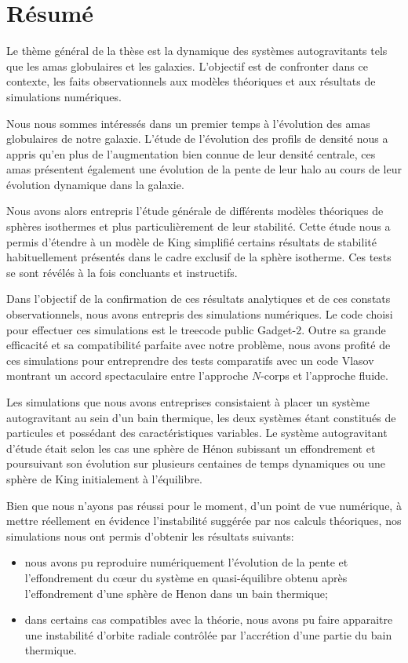 \documentclass[a4paper,11pt,twoside,openright]{report}
\renewcommand{\(}{\ensuremath{\left(}}
\renewcommand{\)}{\ensuremath{\right)}}
\begin{document}
	\chapter*{Résumé}
		Le thème général de la thèse est la dynamique des
		systèmes autogravitants tels que les amas globulaires et les galaxies.
		L'objectif est de confronter dans ce contexte, les faits observationnels aux
		modèles théoriques et aux résultats de simulations numériques.
		
		Nous nous sommes intéressés dans un premier temps à l'évolution des
		amas globulaires de notre galaxie. L'étude de l'évolution des profils de
		densité nous a appris
		qu'en plus de l'augmentation bien connue de leur densité centrale, ces
		amas présentent également une évolution de la pente de leur halo au
		cours de leur évolution dynamique dans la galaxie.

		Nous avons alors entrepris l'étude générale de différents modèles
		théoriques de sphères isothermes et plus particulièrement de leur
		stabilité. Cette étude nous a permis d'étendre à un modèle de King
		simplifié certains résultats de stabilité habituellement présentés dans
		le cadre exclusif de la sphère isotherme. Ces tests se sont révélés à
		la fois concluants et instructifs.

		Dans l'objectif de la confirmation de ces résultats analytiques et de ces
		constats observationnels, nous avons entrepris des simulations numériques. Le
		code choisi pour effectuer ces simulations est le treecode public Gadget-2.
		Outre sa grande efficacité et sa compatibilité parfaite avec notre problème,
		nous avons profité de ces simulations pour entreprendre des tests comparatifs
		avec un code Vlasov montrant un accord spectaculaire entre l'approche $N$-corps et l'approche fluide.

		Les simulations que nous avons entreprises consistaient à placer un système
		autogravitant au sein d'un bain thermique, les deux systèmes étant constitués
		de particules et possédant des caractéristiques variables. Le système
		autogravitant d'étude était selon les cas une sphère de Hénon subissant un
		effondrement et poursuivant son évolution sur plusieurs centaines de temps
		dynamiques ou une sphère de King initialement à l'équilibre.

		Bien que nous n'ayons pas réussi pour le moment, d'un point de vue numérique, à mettre réellement en évidence l'instabilité
		suggérée par nos calculs théoriques, nos simulations nous ont permis d'obtenir les résultats suivants:
		\begin{itemize}
			\item nous avons pu reproduire numériquement l'évolution de la pente et l'effondrement du c\oe ur du système en quasi-équilibre obtenu après l'effondrement d'une sphère de Henon dans un bain thermique;
			\item dans certains cas compatibles avec la théorie, nous avons pu faire apparaitre une instabilité d'orbite radiale contrôlée par l'accrétion d'une partie du bain thermique.
		\end{itemize}
\end{document}
